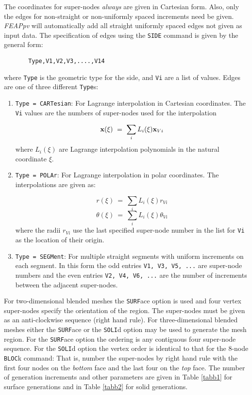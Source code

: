 The coordinates for super-nodes {\it always} are given in Cartesian form.
Also, only the edges for non-straight or non-uniformly spaced increments
need be given.  {\sl FEAPpv} will automatically add all
straight uniformly spaced edges not given as input data.
The specification of edges using the {\tt SIDE} command is given by the
general form:
\begin{verbatim}
       Type,V1,V2,V3,....,V14
\end{verbatim}
where {\tt Type} is the geometric type for the
side, and {\tt Vi} are a list of values.
Edges are one of three different {\tt Type}s:
\begin{enumerate}
\item
{\tt Type = CARTesian}: For Lagrange interpolation in Cartesian coordinates.
The {\tt Vi} values are the numbers of super-nodes used for the interpolation

$$\mathbf{x}(\xi) ~=~ \sum_i L_i(\xi) \mathbf{x}_{Vi}$$
where $L_i(\xi)$ are Lagrange interpolation polynomials in the natural
coordinate $\xi$.

\item
{\tt Type = POLAr}: For Lagrange interpolation in polar coordinates.  The
interpolations are given as:

$$r(\xi) ~=~ \sum_i L_i(\xi) r_{Vi}$$
$$\theta(\xi) ~=~ \sum_i L_i(\xi) \theta_{Vi}$$
where the radii $r_{Vi}$ use the last specified super-node number in the
list for {\tt Vi} as the location of their origin.

\item
{\tt Type = SEGMent}: For multiple straight segments with uniform increments
on each segment.  In this form the odd entries {\tt V1, V3, V5, ...}
are super-node numbers and the even entries {\tt V2, V4, V6, ...}
are the number of increments between the adjacent super-nodes.
\end{enumerate}

For two-dimensional blended meshes the {\tt SURF}ace option is used and 
four vertex super-nodes specify the orientation of the region.
The super-nodes must be given as an anti-clockwise sequence (right hand
rule).
For three-dimensional blended meshes either the {\tt SURF}ace or the
{\tt SOLI}d option may be used to generate the mesh region.  For the
{\tt SURF}ace option the ordering is any contiguous four super-node sequence.
For the {\tt SOLI}d option the vertex order is identical to that for the
8-node {\tt BLOC}k command: That is, number the super-nodes by right hand rule
with the first four nodes on the {\it bottom} face and the last four
on the {\it top} face.
The number of generation increments and other parameters are 
given in Table \ref{tabb1} for surface generations and in Table \ref{tabb2}
for solid generations.


